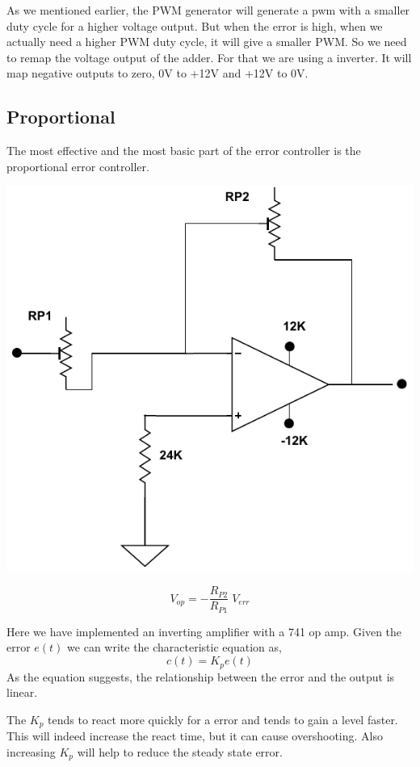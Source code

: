 \begin{multicols}{2}
As we mentioned earlier, the PWM generator will generate a pwm with a smaller duty cycle for a higher voltage output. But when the error is high, when we actually need a higher PWM duty cycle, it will give a  smaller PWM. So we need to remap the voltage output of the adder. For that we are using a inverter. It will map negative outputs to zero, 0V to +12V and +12V to 0V.

\subsection{Proportional}
The most effective and the most basic part of the error controller is the proportional error controller. 

\begin{minipage}{0.45\textwidth}
\centering
\includegraphics[width=\textwidth]{PID/P.pdf}

\end{minipage}

$$V_{op} = -\frac{R_{P2}}{R_{P1}}\; V_{err}$$

Here we have implemented an inverting amplifier with a 741 op amp.
Given the error $e(t)$ we can write the characteristic equation as,
$$c(t)=K_p e(t)$$
As the equation suggests, the relationship between the error and the output is linear. 

The $K_p$ tends to react more quickly for a error and tends to gain a level faster. This will indeed increase the react time, but it can cause overshooting. Also increasing $K_p$ will help to reduce the steady state error.
\\


\end{multicols}
